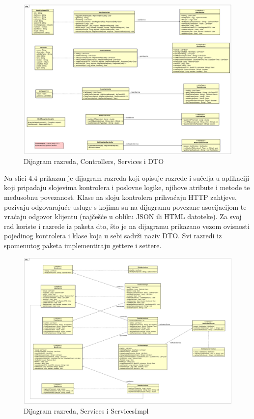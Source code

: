 			\begin{figure}[H]
				\includegraphics[width=\textwidth]{dijagrami/classDiagram3.PNG} 
				\caption{Dijagram razreda, Controllers, Services i DTO}
				\label{fig:classDiagram3}
			\end{figure}
		
			Na slici 4.4 prikazan je dijagram razreda koji opisuje razrede i sučelja u aplikaciji koji pripadaju slojevima kontrolera i poslovne logike, njihove atribute i metode te međusobnu povezanost. Klase na sloju kontrolera prihvaćaju HTTP zahtjeve, pozivaju odgovarajuće usluge s kojima su na dijagramu povezane asocijacijom te vraćaju odgovor klijentu (najčešće u obliku JSON ili HTML datoteke). Za svoj rad koriste i razrede iz paketa dto, što je na dijagramu prikazano vezom ovisnosti pojedinog kontrolera i klase koja u sebi sadrži naziv DTO. Svi razredi iz spomenutog paketa implementiraju gettere i settere.
			
			\begin{figure}[H]
				\includegraphics[width=\textwidth]{dijagrami/classDiagram4.PNG} 
				\caption{Dijagram razreda, Services i ServicesImpl}
				\label{fig:classDiagram4}
			\end{figure}
			
